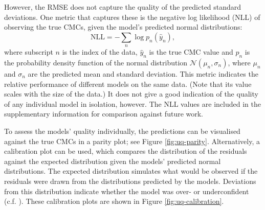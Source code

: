 However, the RMSE does not capture the quality of the predicted standard
deviations. One metric that captures these is the negative log likelihood (NLL)
of observing the true CMCs, given the model's predicted normal distributions:
\begin{equation}
    \text{NLL} = -\sum_n \log p_n(\hat{y}_n),
\end{equation}
where subscript $n$ is the index of the data, $\hat{y}_n$ is the true CMC value
and $p_n$ is the probability density function of the normal distribution
$\mathcal{N}(\mu_n, \sigma_n)$, where $\mu_n$ and $\sigma_n$ are the predicted
mean and standard deviation. This metric indicates the relative performance of
different models on the same data. (Note that its value scales with the size of
the data.) It does not give a good indication of the quality of any individual
model in isolation, however. The NLL values are included in the supplementary
information for comparison against future work.

To assess the models' quality individually, the predictions can be visualised
against the true CMCs in a parity plot; see Figure \ref{fig:uq-parity}.
Alternatively, a calibration plot can be used, which compares the distribution
of the residuals against the expected distribution given the models' predicted
normal distributions. The expected distribution simulates what would be observed
if the residuals were drawn from the distributions predicted by the models.
Deviations from this distribution indicate whether the model was over- or
underconfident (c.f. \citet{tranMethodsComparingUncertainty2020}). These
calibration plots are shown in Figure \ref{fig:uq-calibration}.

